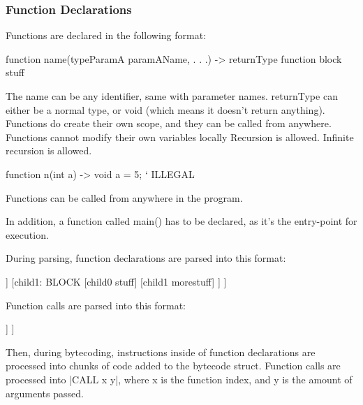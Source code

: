 \documentclass[12pt, letterpaper, oneside]{article}
\begin{document}
	\subsubsection{Function Declarations}
	Functions are declared in the following format:
	\begin{spverbatim}
		function name(typeParamA paramAName, . . .) -> returnType {
			function block stuff
		}
	\end{spverbatim}
	The name can be any identifier, same with parameter names. \newline 
	returnType can either be a normal type, or void (which means it doesn't return anything).
	Functions do create their own scope, and they can be called from anywhere.
	Functions cannot modify their own variables locally
	Recursion is allowed. Infinite recursion is allowed.
	\newpage
	\begin{spverbatim}
		function n(int a) -> void {
			a = 5; ` ILLEGAL
		}
	\end{spverbatim}
	Functions can be called from anywhere in the program.
	
	In addition, a function called main() has to be declared, as it's the entry-point for execution.
	
	During parsing, function declarations are parsed into this format:
	\newline
	\begin{forest}
		[FUNCTIONDECLARATION
		[Left: Name]
		[Right: Returntype]
		[child0: PARAM
		[Left: paramType]
		[right: paramName]
		]
		[child1: BLOCK
		[child0 stuff]
		[child1 morestuff]
		]
		]
	\end{forest}
	Function calls are parsed into this format:
	\newline
	\begin{forest}
		[FUNCCALL
		[Left: Name]
		[Right: NULL]
		[child0: PARAM
		[Left: value]
		]
		]
	\end{forest}
	\newline
	Then, during bytecoding, instructions inside of function declarations are processed into chunks of code added to the bytecode struct.
	Function calls are processed into \spverb|CALL x y|, where x is the function index, and y is the amount of arguments passed.
	\newpage
\end{document}
